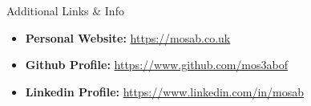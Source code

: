 \documentclass[]{mosabcv}
\begin{document}
\begin{cvsection}{Additional Links \& Info}
  \begin{cvsubsection}{}{}{}
    \begin{itemize}
      \item \textbf{Personal Website:}
        \href{https://mosab.co.uk}{https://mosab.co.uk}
      \item \textbf{Github Profile:}
        \href{https://www.github.com/mos3abof}{https://www.github.com/mos3abof}
      \item \textbf{Linkedin Profile:}
        \href{https://www.linkedin.com/in/mosab}{https://www.linkedin.com/in/mosab}
    \end{itemize}
  \end{cvsubsection}
\end{cvsection}
\end{document}
